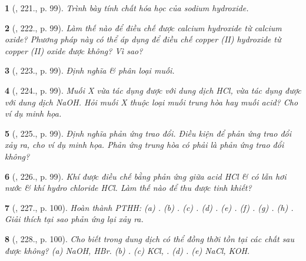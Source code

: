 \documentclass{article}
\newtheorem{baitoan}{}
\begin{document}
\begin{baitoan}[\cite{Nguyen_Buu_Can_500_BT_Hoa_Hoc_THCS}, 221., p. 99]
	Trình bày tính chất hóa học của sodium hydroxide.
\end{baitoan}

\begin{baitoan}[\cite{Nguyen_Buu_Can_500_BT_Hoa_Hoc_THCS}, 222., p. 99]
	Làm thế nào để điều chế được calcium hydroxide từ calcium oxide? Phương pháp này có thể áp dụng để điều chế copper ({\rm II}) hydroxide từ copper ({\rm II}) oxide được không? Vì sao?
\end{baitoan}

\begin{baitoan}[\cite{Nguyen_Buu_Can_500_BT_Hoa_Hoc_THCS}, 223., p. 99]
	Định nghĩa \& phân loại muối.
\end{baitoan}

\begin{baitoan}[\cite{Nguyen_Buu_Can_500_BT_Hoa_Hoc_THCS}, 224., p. 99]
	Muối X vừa tác dụng được với dung dịch {\rm HCl}, vừa tác dụng được với dung dịch {\rm NaOH}. Hỏi muối X thuộc loại muối trung hòa hay muối acid? Cho ví dụ minh họa.
\end{baitoan}

\begin{baitoan}[\cite{Nguyen_Buu_Can_500_BT_Hoa_Hoc_THCS}, 225., p. 99]
	Định nghĩa phản ứng trao đổi. Điều kiện để phản ứng trao đổi xảy ra, cho ví dụ minh họa. Phản ứng trung hòa có phải là phản ứng trao đổi không?
\end{baitoan}

\begin{baitoan}[\cite{Nguyen_Buu_Can_500_BT_Hoa_Hoc_THCS}, 226., p. 99]
	Khí {\rm{}} được điều chế bằng phản ứng giữa acid {\rm HCl \& } có lẫn hơi nước \& khí hydro chloride {\rm HCl}. Làm thế nào để thu được {\rm{}} tinh khiết?
\end{baitoan}

\begin{baitoan}[\cite{Nguyen_Buu_Can_500_BT_Hoa_Hoc_THCS}, 227., p. 100]
	Hoàn thành {\rm PTHH}: {\rm(a) . (b) . (c) . (d) . (e) . (f) . (g) . (h) }. Giải thích tại sao phản ứng lại xảy ra.
\end{baitoan}

\begin{baitoan}[\cite{Nguyen_Buu_Can_500_BT_Hoa_Hoc_THCS}, 228., p. 100]
	Cho biết trong dung dịch có thể đồng thời tồn tại các chất sau được không? {\rm(a) NaOH, HBr. (b) . (c) KCl, . (d) . (e) NaCl, KOH}.
\end{baitoan}
\end{document}
